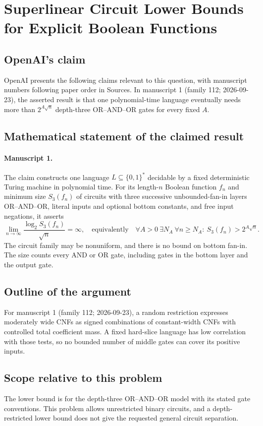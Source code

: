 \documentclass[11pt]{article}
\begin{document}
\section*{Superlinear Circuit Lower Bounds for Explicit Boolean Functions}

\subsection{OpenAI's claim}
OpenAI presents the following claims relevant to this question, with manuscript numbers following paper order in Sources. In manuscript 1 (family 112; 2026-09-23), the asserted result is that one polynomial-time language eventually needs more than $2^{A\sqrt n}$ depth-three OR--AND--OR gates for every fixed $A$.

\subsection{Mathematical statement of the claimed result}
\paragraph{Manuscript 1.}
The claim constructs one language $L\subseteq\{0,1\}^*$ decidable by a fixed deterministic Turing machine in polynomial time. For its length-$n$ Boolean function $f_n$ and minimum size $S_3(f_n)$ of circuits with three successive unbounded-fan-in layers OR--AND--OR, literal inputs and optional bottom constants, and free input negations, it asserts
\[
 \lim_{n\to\infty}\frac{\log_2S_3(f_n)}{\sqrt n}=\infty,
 \quad\text{equivalently}\quad
 \forall A>0\ \exists N_A\ \forall n\ge N_A:\ S_3(f_n)>2^{A\sqrt n}.
\]
The circuit family may be nonuniform, and there is no bound on bottom fan-in. The size counts every AND or OR gate, including gates in the bottom layer and the output gate.

\subsection{Outline of the argument}
For manuscript 1 (family 112; 2026-09-23), a random restriction expresses moderately wide CNFs as signed combinations of constant-width CNFs with controlled total coefficient mass. A fixed hard-slice language has low correlation with those tests, so no bounded number of middle gates can cover its positive inputs.

\subsection{Scope relative to this problem}
The lower bound is for the depth-three OR--AND--OR model with its stated gate conventions. This problem allows unrestricted binary circuits, and a depth-restricted lower bound does not give the requested general circuit separation.
\end{document}
